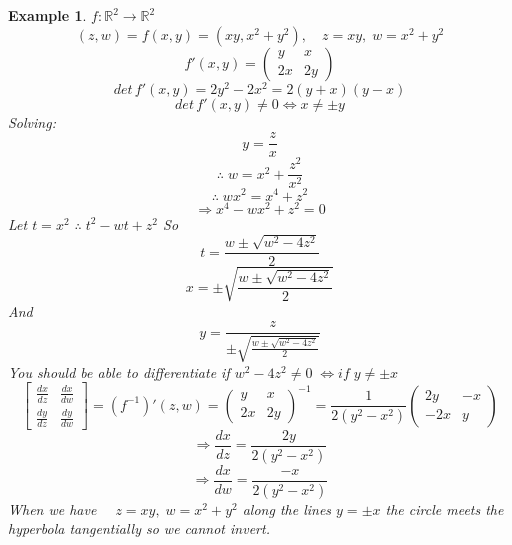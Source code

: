 \documentclass[11pt]{article}
\def\RR{\mathbb{R}}
\newtheorem{example}{Example}[section]
\begin{document}
\begin{example}
$f:\RR^2 \rightarrow \RR^2$
\[(z,w) = f(x,y) = (xy, x^2 + y^2), \quad z=xy, \; w=x^2 +y^2\]
\[f'(x,y) = \begin{pmatrix} y &x \\ 2x & 2y \end{pmatrix}\]
\[det\,f'(x,y) = 2y^2 - 2x^2 = 2(y+x)(y-x)\]
\[det\,f'(x,y) \neq 0 \Leftrightarrow x \neq\pm y \]
Solving:
\[y=\frac{z}{x}\]
\[\therefore \; w = x^2 + \frac{z^2}{x^2}\]
\[\therefore \; wx^2 = x^4 + z^2\]
\[\Rightarrow   x^4 - wx^2 + z^2 = 0\]
Let $t=x^2$ $\therefore \; t^2 - wt +z^2$
So
\[t = \frac{w \pm \sqrt{w^2 - 4z^2}}{2}\]
\[x= \pm \sqrt{\frac{w \pm \sqrt{w^2 - 4z^2}}{2}}\]
And \[y= \frac{z}{\pm \sqrt{\frac{w \pm \sqrt{w^2 - 4z^2}}{2}}}\]
You should be able to differentiate if $w^2 - 4z^2 \neq 0 \; \Leftrightarrow if \; y \neq \pm x$
\[\begin{bmatrix} \tfrac{dx}{dz} &\tfrac{dx}{dw} \\ \tfrac{dy}{dz} & \tfrac{dy}{dw} \end{bmatrix} = (f^{-1})'(z,w) = \begin{pmatrix} y &x \\ 2x & 2y \end{pmatrix}^{-1} = \frac{1}{2(y^2 -x^2)}\begin{pmatrix} 2y &-x \\ -2x & y \end{pmatrix}\]
\[\Rightarrow \frac{dx}{dz} = \frac{2y}{2(y^2 -x^2)}\]
\[\Rightarrow \frac{dx}{dw} = \frac{-x}{2(y^2 -x^2)}\]
When we have $\quad z=xy, \; w=x^2 +y^2$ along the lines $ y = \pm x$ the circle meets the hyperbola tangentially so we cannot invert.
\end{example}
\end{document}
